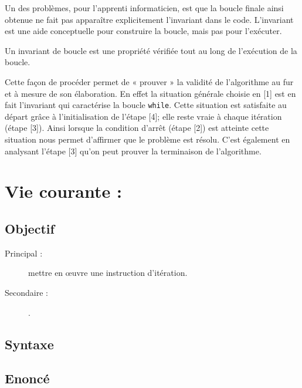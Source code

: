 \begin{enumerate}
	Un des problèmes, pour l'apprenti informaticien, est que la boucle finale
	ainsi obtenue ne fait pas apparaître explicitement l'invariant dans le code. 
	L'invariant est une aide conceptuelle pour construire la boucle, 
	mais pas pour l'exécuter.
\end{enumerate}

\begin{definition}
Un invariant de boucle est une propriété vérifiée tout au long de 
l'exécution de la boucle. 
\end{definition}

Cette façon de procéder permet de « prouver » la validité de l'algorithme au fur et à
mesure de son élaboration. En effet la situation générale choisie en [1] est en fait l'invariant 
qui caractérise la boucle {\tt while}.
Cette situation est satisfaite au départ grâce à l'initialisation de l'étape [4]; 
elle reste vraie à chaque itération (étape [3]). Ainsi lorsque la condition d'arrêt (étape [2])
est atteinte cette situation nous permet d'affirmer que le problème est résolu.
C'est également en analysant l'étape [3] qu'on peut prouver la terminaison de l'algorithme.


\section{Vie courante : }\label{boucles:vie-courante}

\subsection{Objectif}\label{boucles:vie-courante:objectif}
\begin{description}
\item[Principal : ] mettre en \oe uvre une instruction d'itération.
\item[Secondaire :] .
\end{description}


\subsection{Syntaxe \python}\label{boucles:vie-courante:python}

\subsection{Enoncé}\label{boucles:vie-courante:enonce}

